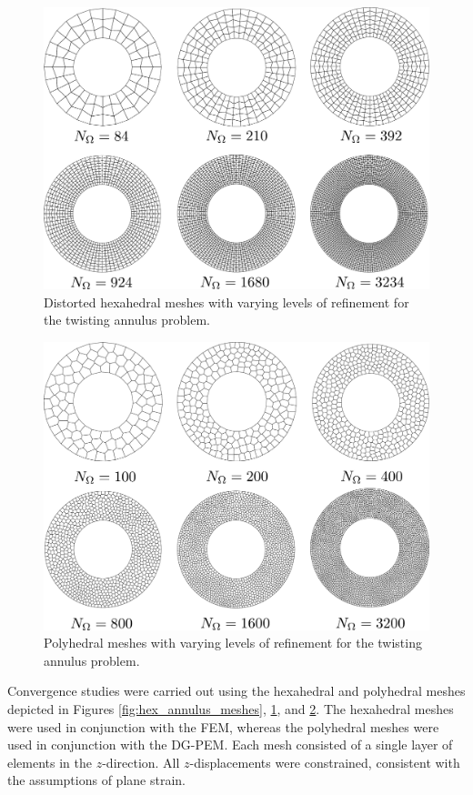\begin{figure}[!h]
  \centering
  \includegraphics[width=5.0in]{figures/hexp_annulus_meshes.pdf}
  \caption{Distorted hexahedral meshes with varying levels of refinement for the twisting annulus problem.}
  \label{fig:hexp_annulus_meshes}
\end{figure}

\begin{figure}[!h]
  \centering
  \includegraphics[width=5.0in]{figures/poly_annulus_meshes.pdf}
  \caption{Polyhedral meshes with varying levels of refinement for the twisting annulus problem.}
  \label{fig:poly_annulus_meshes}
\end{figure}

Convergence studies were carried out using the hexahedral and polyhedral meshes depicted in Figures \ref{fig:hex_annulus_meshes}, \ref{fig:hexp_annulus_meshes}, and \ref{fig:poly_annulus_meshes}. The hexahedral meshes were used in conjunction with the FEM, whereas the polyhedral meshes were used in conjunction with the DG-PEM. Each mesh consisted of a single layer of elements in the $z$-direction. All $z$-displacements were constrained, consistent with the assumptions of plane strain.

